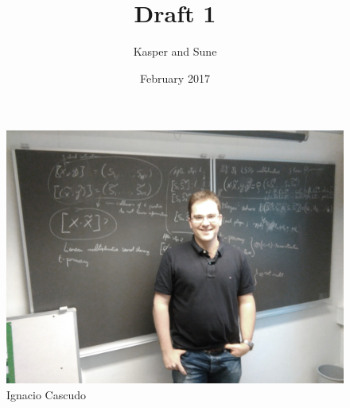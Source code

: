 \documentclass[a4paper]{article}
\title{Draft 1}
\author{Kasper and  Sune}
\date{February 2017}
\theoremstyle{plain}
\begin{document}
\maketitle

\begin{figure}[h]
    \centering
    \includegraphics[scale=0.1]{Ignacio.jpg}
    \caption{Ignacio Cascudo}
\end{figure}























\clearpage


\clearpage


\clearpage

\end{document}
